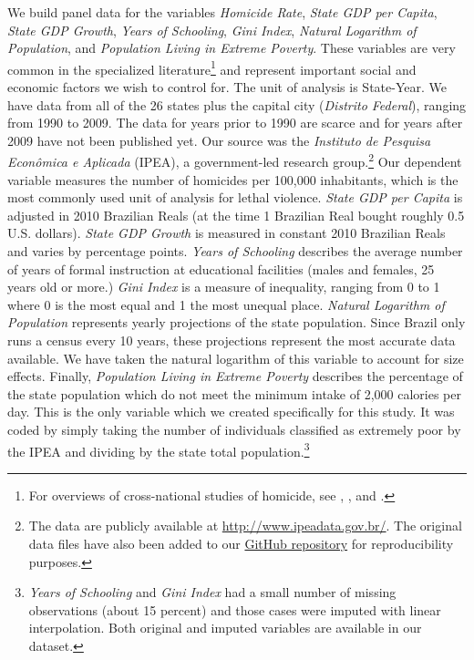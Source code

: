 \documentclass[a4paper,11pt]{article}
\begin{document}
We build panel data for the variables \textit{Homicide Rate}, \textit{State GDP per Capita}, \textit{State GDP Growth}, \textit{Years of Schooling}, \textit{Gini Index}, \textit{Natural Logarithm of Population}, and \textit{Population Living in Extreme Poverty}. These variables are very common in the specialized literature\footnote{For overviews of cross-national studies of homicide, see \citet{lafree1999summary}, \citet{nivette2011cross}, and \citet{trent2012review}.} and represent important social and economic factors we wish to control for. The unit of analysis is State-Year. We have data from all of the 26 states plus the capital city (\textit{Distrito Federal}), ranging from 1990 to 2009. The data for years prior to 1990 are scarce and for years after 2009 have not been published yet. Our source was the \textit{Instituto de Pesquisa Econ\^{o}mica e Aplicada} (IPEA), a government-led research group.\footnote{The data are publicly available at \href{http://www.ipeadata.gov.br/}{http://www.ipeadata.gov.br/}. The original data files have also been added to our \href{https://github.com/danilofreire/replication-files/tree/master/2015/intelligent-policing}{GitHub repository} for reproducibility purposes.} Our dependent variable measures the number of homicides per 100,000 inhabitants, which is the most commonly used unit of analysis for lethal violence. \textit{State GDP per Capita} is adjusted in 2010 Brazilian Reals (at the time 1 Brazilian Real bought roughly 0.5 U.S. dollars). \textit{State GDP Growth} is measured in constant 2010 Brazilian Reals and varies by percentage points. \textit{Years of Schooling} describes the average number of years of formal instruction at educational facilities (males and females, 25 years old or more.) \textit{Gini Index} is a measure of inequality, ranging from 0 to 1 where 0 is the most equal and 1 the most unequal place. \textit{Natural Logarithm of Population} represents yearly projections of the state population. Since Brazil only runs a census every 10 years, these projections represent the most accurate data available. We have taken the natural logarithm of this variable to account for size effects. Finally, \textit{Population Living in Extreme Poverty} describes the percentage of the state population which do not meet the minimum intake of 2,000 calories per day. This is the only variable which we created specifically for this study. It was coded by simply taking the number of individuals classified as extremely poor by the IPEA and dividing by the state total population.\footnote{\textit{Years of Schooling} and \textit{Gini Index} had a small number of missing observations (about 15 percent) and those cases were imputed with linear interpolation. Both original and imputed variables are available in our dataset.}
\end{document}
